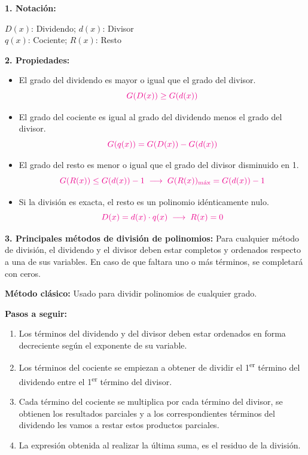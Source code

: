 \documentclass[11pt,a4paper]{article}
\newcommand{\hl}[1]{\textcolor{resaltado}{#1}}
\begin{document}
\textbf{1. Notación:} \quad {}
\begin{center}
\textcolor{rojo}{$D(x)$}: Dividendo; \quad \textcolor{rojo}{$d(x)$}: Divisor\\
\textcolor{rojo}{$q(x)$}: Cociente; \quad \textcolor{rojo}{$R(x)$}: Resto
\end{center}

\textbf{2. Propiedades:}
\begin{itemize}[label=\checkmark]
  \item El grado del dividendo es mayor o igual que el grado del divisor.
  \[\textcolor{magenta}{G(D(x)) \geq G(d(x))}\]
  \item El grado del cociente es igual al grado del dividendo menos el grado del divisor.
  \[\textcolor{magenta}{G(q(x)) = G(D(x)) - G(d(x))}\]
  \item El grado del resto es menor o igual que el grado del divisor disminuido en 1.
  \[\textcolor{magenta}{G(R(x)) \leq G(d(x)) - 1 \;\longrightarrow\; G(R(x))_{\text{máx}} = G(d(x)) - 1}\]
  \item Si la división es exacta, el resto es un polinomio idénticamente nulo.
  \[\textcolor{magenta}{D(x) = d(x)\cdot q(x) \;\longrightarrow\; R(x) = 0}\]
\end{itemize}

\textbf{3. Principales métodos de división de polinomios:} \hl{Para cualquier método de
división, el dividendo y el divisor deben estar completos y ordenados} respecto a una de
sus variables. \hl{En caso de que faltara uno o más términos, se completará con ceros.}

\textcolor{verde}{\textbf{Método clásico:}} Usado para dividir polinomios de cualquier grado.

\textcolor{verde}{\textbf{Pasos a seguir:}}
\begin{enumerate}
  \item Los términos del dividendo y del divisor deben estar ordenados en forma decreciente
  según el exponente de su variable.
  \item Los términos del cociente se empiezan a obtener de dividir el 1\textsuperscript{er}
  término del dividendo entre el 1\textsuperscript{er} término del divisor.

  \item Cada término del cociente se multiplica por cada término del divisor, se obtienen
  los resultados parciales y a los correspondientes términos del dividendo les vamos a
  restar estos productos parciales.
  \item La expresión obtenida al realizar la última suma, es el residuo de la división.
\end{enumerate}
\end{document}
